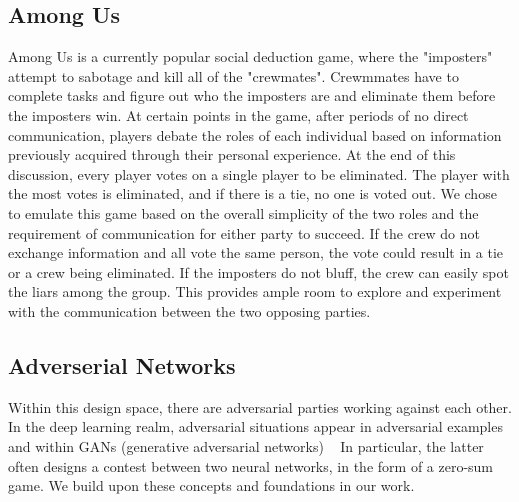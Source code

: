 \documentclass[10pt,twocolumn,letterpaper]{article}
\begin{document}
\subsection{Among Us}
Among Us is a currently popular social deduction game,
where the "imposters" attempt to sabotage and kill all of the "crewmates". Crewmmates have
to complete tasks and figure out who the imposters are and eliminate them before the imposters
win.
At certain points in the game, after periods of no direct communication, players 
debate the roles of each individual based on information previously acquired through
their personal experience. At the end of this discussion, every player votes on a single
player to be eliminated. The player with the most votes is eliminated, and if there
is a tie, no one is voted out. We chose to emulate this game based on
the overall simplicity of the two roles and the requirement of communication
for either party to succeed. If the crew do not exchange information 
and all vote the same person, 
the vote could result in a tie or a crew being eliminated.
If the imposters do not bluff, the crew can easily spot the liars among the group. 
This provides ample room to explore and experiment with the communication between
the two opposing parties.
\subsection{Adverserial Networks}
Within this design space, there are adversarial parties working against each other.
In the deep learning realm, adversarial situations appear in adversarial examples~\cite{AdverserialEx} and within GANs (generative adversarial networks)
~\cite{NIPS2014_5ca3e9b1}
In particular, the latter often designs a contest between two neural networks, in the form
of a zero-sum game.
We build upon these concepts and foundations in our work.
\end{document}
